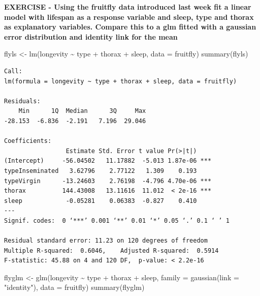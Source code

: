 \documentclass[
]{book}
\newenvironment{Shaded}{\begin{snugshade}}{\end{snugshade}}
\newcommand{\AttributeTok}[1]{\textcolor[rgb]{0.77,0.63,0.00}{#1}}
\newcommand{\FunctionTok}[1]{\textcolor[rgb]{0.00,0.00,0.00}{#1}}
\newcommand{\NormalTok}[1]{#1}
\newcommand{\OtherTok}[1]{\textcolor[rgb]{0.56,0.35,0.01}{#1}}
\newcommand{\SpecialCharTok}[1]{\textcolor[rgb]{0.00,0.00,0.00}{#1}}
\newcommand{\StringTok}[1]{\textcolor[rgb]{0.31,0.60,0.02}{#1}}
\begin{document}
\textbf{EXERCISE - Using the fruitfly data introduced last week fit a linear model with lifespan as a response variable and sleep, type and thorax as explanatory variables. Compare this to a glm fitted with a gaussian error distribution and identity link for the mean}

\begin{Shaded}
\begin{Highlighting}[]
\NormalTok{flyls }\OtherTok{\textless{}{-}} \FunctionTok{lm}\NormalTok{(longevity }\SpecialCharTok{\textasciitilde{}}\NormalTok{ type }\SpecialCharTok{+}\NormalTok{ thorax }\SpecialCharTok{+}\NormalTok{ sleep, }\AttributeTok{data =}\NormalTok{ fruitfly)}
\FunctionTok{summary}\NormalTok{(flyls)}
\end{Highlighting}
\end{Shaded}

\begin{verbatim}
Call:
lm(formula = longevity ~ type + thorax + sleep, data = fruitfly)

Residuals:
    Min      1Q  Median      3Q     Max 
-28.153  -6.836  -2.191   7.196  29.046 

Coefficients:
                 Estimate Std. Error t value Pr(>|t|)    
(Intercept)     -56.04502   11.17882  -5.013 1.87e-06 ***
typeInseminated   3.62796    2.77122   1.309    0.193    
typeVirgin      -13.24603    2.76198  -4.796 4.70e-06 ***
thorax          144.43008   13.11616  11.012  < 2e-16 ***
sleep            -0.05281    0.06383  -0.827    0.410    
---
Signif. codes:  0 ‘***’ 0.001 ‘**’ 0.01 ‘*’ 0.05 ‘.’ 0.1 ‘ ’ 1

Residual standard error: 11.23 on 120 degrees of freedom
Multiple R-squared:  0.6046,    Adjusted R-squared:  0.5914 
F-statistic: 45.88 on 4 and 120 DF,  p-value: < 2.2e-16
\end{verbatim}

\begin{Shaded}
\begin{Highlighting}[]
\NormalTok{flyglm }\OtherTok{\textless{}{-}} \FunctionTok{glm}\NormalTok{(longevity }\SpecialCharTok{\textasciitilde{}}\NormalTok{ type }\SpecialCharTok{+}\NormalTok{ thorax }\SpecialCharTok{+}\NormalTok{ sleep, }
             \AttributeTok{family =} \FunctionTok{gaussian}\NormalTok{(}\AttributeTok{link =} \StringTok{"identity"}\NormalTok{),}
             \AttributeTok{data =}\NormalTok{ fruitfly)}
\FunctionTok{summary}\NormalTok{(flyglm)}
\end{Highlighting}
\end{Shaded}
\end{document}
